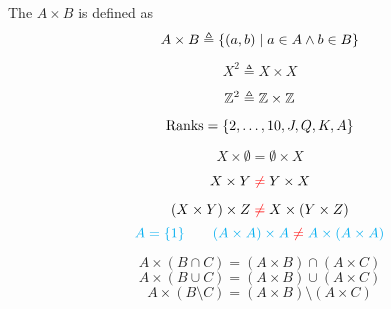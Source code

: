 
\begin{frame}{}
  \begin{definition}
    The  $A \times B$ 
    is defined as
    \[
      {A \times B \triangleq \{(a, b) \mid a \in A \land b \in B\}}
    \]
  \end{definition}

  \pause
  \[
    X^2 \triangleq X \times X
  \]

  \pause
\end{frame}

\begin{frame}{}
  \[
    \mathbb{Z}^{2} \triangleq \mathbb{Z} \times \mathbb{Z}
  \]
\end{frame}

\begin{frame}{}
  \[
    \text{Ranks} = \{2, \dots, 10, J, Q, K, A\}
  \]
\end{frame}

\begin{frame}{}
  \[
    X \times \emptyset = \emptyset \times X
  \]

  \pause
  \[
    X \times Y \;\textcolor{red}{\neq}\; Y \times X
  \]

  \pause
  \[
    (X \times Y) \times Z \;\textcolor{red}{\neq}\; X \times (Y \times Z)
  \]
  \pause
  \[
    \textcolor{cyan}{A = \{1\} \qquad (A \times A) \times A \;\textcolor{red}{\neq}\; A \times (A \times A)}
  \]
\end{frame}

\begin{frame}{}
  \begin{theorem}
    \[
      A \times (B \cap C) = (A \times B) \cap (A \times C)
    \]
    \[
      A \times (B \cup C) = (A \times B) \cup (A \times C)
    \]
    \[
      A \times (B \setminus C) = (A \times B) \setminus (A \times C)
    \]
  \end{theorem}

  \pause
\end{frame}

